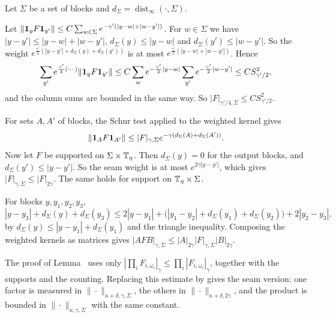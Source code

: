 \begin{detail}\label{d9:seam}
Let $\Sigma$ be a set of blocks and $d_\Sigma=\operatorname{dist}_\infty(\cdot,\Sigma)$.
\begin{step}
Let $\|\mathbf 1_yF\mathbf 1_{y'}\|\le C\sum_{w\in\Sigma}e^{-\gamma'(|y-w|+|w-y'|)}$. For $w\in\Sigma$ we have $|y-y'|\le|y-w|+|w-y'|$, $d_\Sigma(y)\le|y-w|$ and $d_\Sigma(y')\le|w-y'|$. So the weight $e^{\frac{\gamma'}4(|y-y'|+d_\Sigma(y)+d_\Sigma(y'))}$ is at most $e^{\frac{\gamma'}2(|y-w|+|w-y'|)}$. Hence
\[
\sum_{y'}e^{\frac{\gamma'}4(\cdots)}\|\mathbf 1_yF\mathbf 1_{y'}\|\le C\sum_{w}e^{-\frac{\gamma'}2|y-w|}\sum_{y'}e^{-\frac{\gamma'}2|w-y'|}\le CS_{\gamma'/2}^2 ,
\]
and the column sums are bounded in the same way. So $|F|_{\gamma'/4,\Sigma}\le CS^2_{\gamma'/2}$.
\end{step}
\begin{step}
For sets $A,A'$ of blocks, the Schur test applied to the weighted kernel gives
\[
\|\mathbf 1_AF\mathbf 1_{A'}\|\le|F|_{\gamma,\Sigma}e^{-\gamma(d_\Sigma(A)+d_\Sigma(A'))} .
\]
Now let $F$ be supported on $\Sigma\times\mathbb T_\eta$. Then $d_\Sigma(y)=0$ for the output blocks, and $d_\Sigma(y')\le|y-y'|$. So the seam weight is at most $e^{2\gamma|y-y'|}$, which gives $|F|_{\gamma,\Sigma}\le|F|_{2\gamma}$. The same holds for support on $\mathbb T_\eta\times\Sigma$.
\end{step}
\begin{step}
For blocks $y,y_1,y_2,y_3$,
\[
|y-y_3|+d_\Sigma(y)+d_\Sigma(y_3)\le2|y-y_1|+\big(|y_1-y_2|+d_\Sigma(y_1)+d_\Sigma(y_2)\big)+2|y_2-y_3| ,
\]
by $d_\Sigma(y)\le|y-y_1|+d_\Sigma(y_1)$ and the triangle inequality. Composing the weighted kernels as matrices gives $|AFB|_{\gamma,\Sigma}\le|A|_{2\gamma}|F|_{\gamma,\Sigma}|B|_{2\gamma}$.
\end{step}
\begin{step}[Products]
The proof of Lemma~ uses only $|\prod_iF_{i,\omega_i}|_\gamma\le\prod_i|F_{i,\omega_i}|_\gamma$, together with the supports and the counting. Replacing this estimate by  gives the seam version: one factor is measured in $\|\cdot\|_{\kappa+\delta,\gamma,\Sigma}$, the others in $\|\cdot\|_{\kappa+\delta,2\gamma}$, and the product is bounded in $\|\cdot\|_{\kappa,\gamma,\Sigma}$ with the same constant.
\end{step}
\end{detail}

